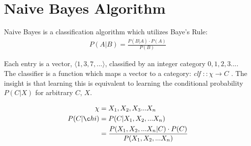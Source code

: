 \documentclass[12pt]{article}
\begin{document}
\section{Naive Bayes Algorithm}
Naive Bayes is a classification algorithm which utilizes Baye's Rule:
\begin{align}
  P(A | B) = \frac{P(B | A) \cdot P(A)}{P(B)}
\end{align}

Each entry is a vector, $\langle 1, 3, 7, ... \rangle$, classified by
an integer category $0, 1, 2, 3 ... $. The classifier is a function
which maps a vector to a category: \textit{clf} $:: \chi \rightarrow C$ .
The insight is that learning this is equivalent to learning
the conditional probability $P(C | X)$ for arbitrary $C$, $X$.

\begin{align}
  \chi &= X_1, X_2, X_3 ... X_n \\
  P(C | \c
  hi) &= P (C | X_1, X_2, ... X_n) \\
  &= \frac{P(X_1, X_2, ... X_n | C) \cdot P(C)}{P(X_1, X_2, ... X_n)}
\end{align}
\end{document}
